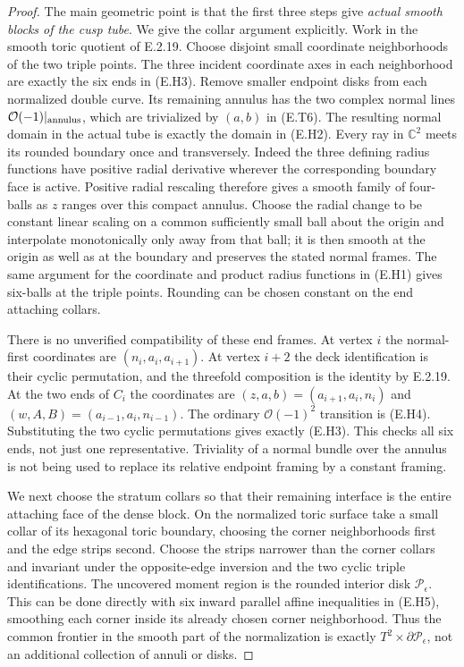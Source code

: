 \begin{proof}
The main geometric point is that the first three steps give
\emph{actual smooth blocks of the cusp tube}.  We give the collar
argument explicitly.  Work in the smooth toric quotient of E.2.19.
Choose disjoint small coordinate neighborhoods of the two triple
points.  The three incident coordinate axes in each neighborhood
are exactly the six ends in (E.H3).  Remove smaller endpoint disks
from each normalized double curve.  Its remaining annulus has
the two complex normal lines $\mathcal O(-1)|_{\rm annulus}$,
which are trivialized by $(a,b)$ in (E.T6).  The resulting normal
domain in the actual tube is exactly the domain in (E.H2).
Every ray in $\mathbb C^2$ meets its rounded boundary once and
transversely.  Indeed the three defining radius functions have
positive radial derivative wherever the corresponding boundary
face is active.  Positive radial rescaling therefore gives a
smooth family of four-balls as $z$ ranges over this compact
annulus.  Choose the radial change to be constant linear scaling
on a common sufficiently small ball about the origin and interpolate
monotonically only away from that ball; it is then smooth at the
origin as well as at the boundary and preserves the stated normal
frames.  The same argument for the coordinate and product
radius functions in (E.H1) gives six-balls at the triple points.
Rounding can be chosen constant on the end attaching collars.

There is no unverified compatibility of these end frames.  At
vertex $i$ the normal-first coordinates are $(n_i,a_i,a_{i+1})$.
At vertex $i+2$ the deck identification is their cyclic
permutation, and the threefold composition is the identity by
E.2.19.  At the two ends of $C_i$ the coordinates are
$(z,a,b)=(a_{i+1},a_i,n_i)$ and
$(w,A,B)=(a_{i-1},a_i,n_{i-1})$.  The ordinary
$\mathcal O(-1)^2$ transition is (E.H4).  Substituting the two
cyclic permutations gives exactly (E.H3).  This checks all six
ends, not just one representative.  Triviality of a normal bundle
over the annulus is not being used to replace its relative
endpoint framing by a constant framing.

We next choose the stratum collars so that their remaining
interface is the entire attaching face of the dense block.
On the normalized toric surface take a small collar of its
hexagonal toric boundary, choosing the corner neighborhoods
first and the edge strips second.  Choose the strips narrower
than the corner collars and invariant under the opposite-edge
inversion and the two cyclic triple identifications.  The
uncovered moment region is the rounded interior disk
$\mathcal P_\epsilon$.  This can be done directly with six
inward parallel affine inequalities in (E.H5), smoothing each
corner inside its already chosen corner neighborhood.  Thus the
common frontier in the smooth part of the normalization is
exactly $T^2\times\partial\mathcal P_\epsilon$, not an additional
collection of annuli or disks.


\end{proof}
